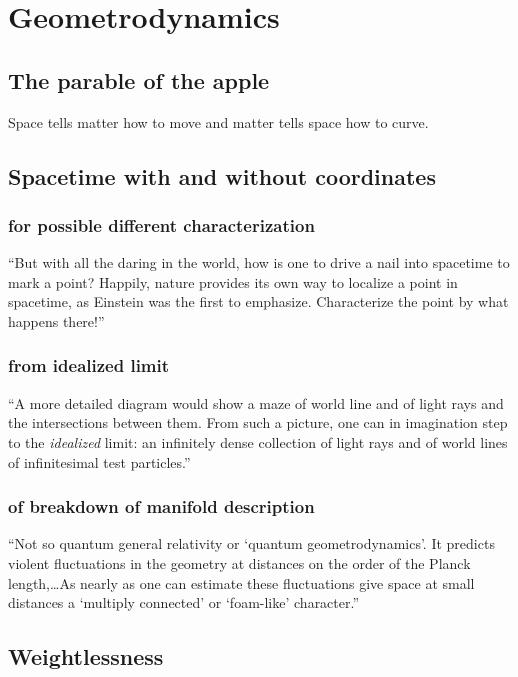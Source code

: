 \section{Geometrodynamics}\label{sec:chapter1}


\subsection{The parable of the apple}\label{susec:1_1}
Space tells matter how to move and matter tells space how to curve.

\subsection{Spacetime with and without coordinates}\label{susec:1_2}
\subsubsection{\hint for possible different characterization }

\enquote{But with all the daring in the world, how is one to drive a nail into spacetime to mark a point? Happily, nature provides its own way to localize a point in spacetime, as Einstein was the first to emphasize. Characterize the point by what happens there!}

\subsubsection{\hint from idealized limit }

\enquote{A more detailed diagram would show a maze of world line and of light rays and the intersections between them. From such a picture, one can in imagination step to the \emph{idealized} limit: an infinitely dense collection of light rays and of world lines of infinitesimal test particles.}

\subsubsection{\hint of breakdown of manifold description }
\enquote{Not so quantum general relativity or \enquote{quantum geometrodynamics}. It predicts violent fluctuations in the geometry at distances on the order of the Planck length,\dots As nearly as one can estimate these fluctuations give space at small distances a \enquote{multiply connected} or \enquote{foam-like} character.}

\subsection{Weightlessness}\label{susec:1_3}
